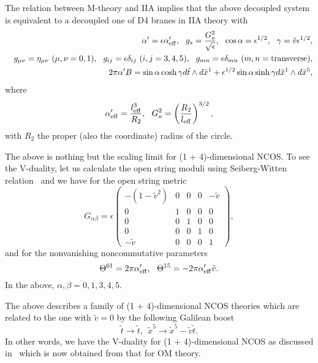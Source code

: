 \documentclass[a4paper,12pt]{article}
\begin{document}
	The relation between M-theory and IIA implies that the above
decoupled system is equivalent to a decoupled one of D4 branes
in IIA theory with
\begin{eqnarray}
&&\alpha' = \epsilon \alpha'_{\rm eff}, \ \ g_s = \frac{G^2_o}{\sqrt
\epsilon},\ \ \cos\alpha = \epsilon^{1/2}, \ \ \gamma = \tilde v   
\epsilon^{1/2},\nonumber\\
&&g_{\mu\nu} = \eta_{\mu\nu}~
(\mu, \nu = 0, 1), \ \ g_{ij} = \epsilon \delta_{ij}~ (i, j = 3, 4, 5),\ \
g_{m n}  = \epsilon \delta_{mn}~ (m, n = {\rm transverse}),\nonumber\\
&& 2 \pi \alpha' B =  \sin\alpha \cosh\gamma d\tilde t\wedge d \tilde x^1 
   + \epsilon^{1/2} \sin\alpha \sinh\gamma d\tilde x^1\wedge d\tilde x^5,
\end{eqnarray}
where 
\begin{equation}
\alpha'_{\rm eff} = \frac{l^3_{\rm eff}}{R_2}, \ \ G^2_o =
\left(\frac{R_2}{l_{\rm eff}}\right)^{3/2},
\label{eq:pr}
\end{equation}
with $R_2$ the proper (also the coordinate) radius of the circle.

	The above is nothing but the scaling limit for (1 +
4)-dimensional NCOS. To see the V-duality, let us calculate the open
string moduli using Seiberg-Witten relation~\cite{SW} and we have for
the open string metric
\begin{equation}
G_{\alpha\beta} = \epsilon \left(\begin{array}{ccccc}
				- (1 - \tilde v^2)&0&0&0&- \tilde v\\
                                  0&1&0&0&0\\
                                  0&0&1&0&0\\
                                  0&0&0&1&0\\
                                 -\tilde v&0&0&0&1\end{array}\right),
\label{eq:ncosm}
\end{equation}
and for the nonvanishing noncommutative parameters
\begin{equation}
\Theta^{01} = 2\pi \alpha'_{\rm eff},\ \ \Theta^{15} = - 2\pi
\alpha'_{\rm eff} \tilde v.
\label{eq:ncp}
\end{equation}
In the above, $\alpha, \beta = 0, 1, 3, 4, 5$.

	The above describes a family of (1 + 4)-dimensional NCOS
theories which are related to the one with $\tilde v = 0$ by the
following Galilean boost
\begin{equation}
\tilde t \to \tilde t, \ \ \tilde x^5 \to \tilde x^5 - \tilde v \tilde
t.
\label{eq:ngb}
\end{equation}
In other words, we have the V-duality for (1 + 4)-dimensional NCOS as
discussed in~\cite{CW,CLW} which is now obtained from that for OM theory.
\end{document}
